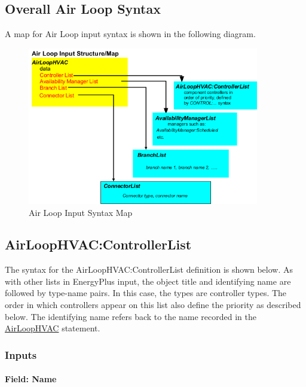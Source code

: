 \subsection{Overall Air Loop Syntax}\label{overall-air-loop-syntax}

A map for Air Loop input syntax is shown in the following diagram.

\begin{figure}[hbtp] %
\centering
\includegraphics[width=0.9\textwidth, height=0.9\textheight, keepaspectratio=true]{media/image214.png}
\caption{Air Loop Input Syntax Map \protect \label{fig:air-loop-input-syntax-map}}
\end{figure}

\subsection{AirLoopHVAC:ControllerList}\label{airloophvaccontrollerlist}

The syntax for the AirLoopHVAC:ControllerList definition is shown below. As with other lists in EnergyPlus input, the object title and identifying name are followed by type-name pairs. In this case, the types are controller types. The order in which controllers appear on this list also define the priority as described below. The identifying name refers back to the name recorded in the \hyperref[airloophvac]{AirLoopHVAC} statement.

\subsubsection{Inputs}\label{inputs-1-002}

\paragraph{Field: Name}\label{field-name-1-001}

